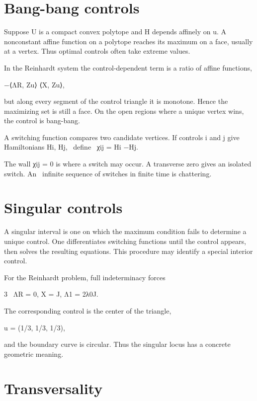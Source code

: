 \section{Bang-bang controls}

Suppose U is a compact convex polytope and H depends affinely on u. A nonconstant affine function on a polytope reaches its maximum on a face, usually at a vertex. Thus optimal controls often take extreme values.


In the Reinhardt system the control-dependent term is a ratio of affine functions,


−⟨ΛR, Zu⟩ ⟨X, Zu⟩,


but along every segment of the control triangle it is monotone. Hence the maximizing set is still a face. On the open regions where a unique vertex wins, the control is bang-bang.


\begin{displaytext}
A switching function compares two candidate vertices. If controls i and j give Hamiltonians Hi, Hj, \
define \
χij = Hi −Hj.
\end{displaytext}

\begin{displaytext}
The wall χij = 0 is where a switch may occur. A transverse zero gives an isolated switch. An \
infinite sequence of switches in finite time is chattering.
\end{displaytext}

\section{Singular controls}

A singular interval is one on which the maximum condition fails to determine a unique control. One differentiates switching functions until the control appears, then solves the resulting equations. This procedure may identify a special interior control.


For the Reinhardt problem, full indeterminacy forces


\begin{displaytext}
3 \
ΛR = 0, X = J, Λ1 = 2λ0J.
\end{displaytext}

The corresponding control is the center of the triangle,


u = (1/3, 1/3, 1/3),


and the boundary curve is circular. Thus the singular locus has a concrete geometric meaning.


\section{Transversality}


